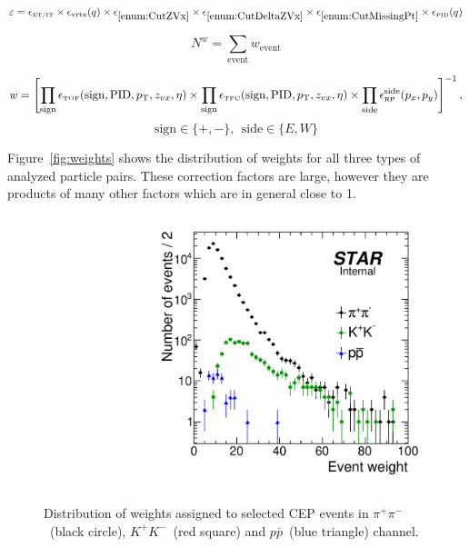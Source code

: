 \begin{equation}
	\varepsilon = \epsilon_{\textrm{\tiny ET/IT}} \times \epsilon_{\textrm{vrtx}}(q) \times \epsilon_{\ref{enum:CutZVx}} \times \epsilon_{\ref{enum:CutDeltaZVx}} \times \epsilon_{\ref{enum:CutMissingPt}} \times \epsilon_{\textrm{\tiny PID}}(q)
\end{equation}

\begin{equation}
	N^{\mathit{w}} = \sum\limits_{\textrm{event}}\mathit{w}_{\textrm{event}}
\end{equation}



\begin{equation}\label{eq:weight}
	\mathit{w} = \left[\prod\limits_{\textrm{sign}} \epsilon_{\textrm{\tiny TOF}}(\textrm{sign}, \textrm{PID}, p_{\text{T}},z_{vx},\eta)  \times \prod\limits_{\textrm{sign}} \epsilon_{\textrm{\tiny TPC}}(\textrm{sign}, \textrm{PID}, p_{\text{T}},z_{vx},\eta) \times \prod\limits_{\textrm{side}}\epsilon_{\textrm{\tiny RP}}^{\textrm{side}}(p_{x},p_{y}) \right]^{-1},
\end{equation}
\[\textrm{sign}\in\{+,-\},~~\textrm{side}\in\{E,W\}\]

Figure~\ref{fig:weights} shows the distribution of weights for all three types of analyzed particle pairs. These correction factors are large,  however they are products of many other factors which are in general close to 1.

\begin{figure}[h!]
\centering%
\parbox{0.4725\textwidth}{%
  \centering%
  \includegraphics[width=\linewidth]{graphics/corrections/Weights.pdf}\label{fig:weights} 
}%
\quad%
\parbox{0.4725\textwidth}{%
    \caption[Distribution of weights assigned to selected CEP events.]{Distribution of weights assigned to selected CEP events in $\pi^{+}\pi^{-}$~(black circle), $K^{+}K^{-}$~(red square) and $p\bar{p}$~(blue triangle) channel.}\label{fig:weigths}%
}
\end{figure}




